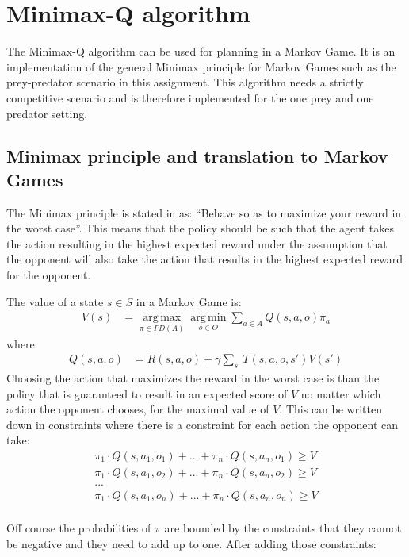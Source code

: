 
\section{Minimax-Q algorithm}
The Minimax-Q algorithm can be used for planning in a Markov Game. It is an implementation of the general Minimax principle for Markov Games such as the prey-predator scenario in this assignment. This algorithm needs a strictly competitive scenario and is therefore implemented for the one prey and one predator setting. 

\subsection{Minimax principle and translation to Markov Games}
The Minimax principle is stated in \cite{minimax} as: ``Behave so as to maximize your reward in the worst case''. This means that the policy should be such that the agent takes the action resulting in the highest expected reward under the assumption that the opponent will also take the action that results in the highest expected reward for the opponent.  

 
The value of a state $s\in S$ in a Markov Game is:
\begin{align*}
V(s) &= \operatorname*{arg\,max}_{\pi \in PD(A)}
\operatorname*{arg\,min}_{o \in O}
\sum_{a \in A} Q(s,a,o) \pi_a
\end{align*}
where
\begin{align*}
Q(s,a,o) &= R(s,a,o) + \gamma \sum_{s'} T(s,a,o,s')V(s')
\end{align*}
Choosing the action that maximizes the reward in the worst case is than the policy that is guaranteed to result in an expected score of $V$ no matter which action the opponent chooses, for the maximal value of $V$. This can be written down in constraints where there is a constraint for each action the opponent can take:
%  
\begin{align*}
\pi_1 \cdot Q(s,a_1,o_1)+ ... + \pi_n \cdot Q(s,a_n,o_1) \geq V\\
\pi_1 \cdot Q(s,a_1,o_2)+ ... + \pi_n \cdot Q(s,a_n,o_2) \geq V\\
...\\
\pi_1 \cdot Q(s,a_1,o_n)+ ... + \pi_n \cdot Q(s,a_n,o_n) \geq V\\
\end{align*}

Off course the probabilities of $\pi$ are bounded by the constraints that they cannot be negative and they need to add up to one. After adding those constraints:

